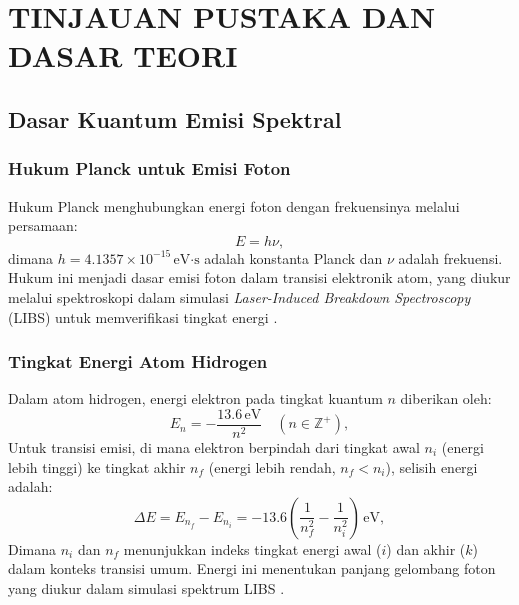 
\chapter{TINJAUAN PUSTAKA DAN DASAR TEORI}

\section{Dasar Kuantum Emisi Spektral}

\subsection{Hukum Planck untuk Emisi Foton}
Hukum Planck menghubungkan energi foton dengan frekuensinya melalui persamaan:
\begin{equation}
E = h\nu, \label{planck}
\end{equation}
dimana \( h = 4.1357 \times 10^{-15} \, \text{eV·s} \) adalah konstanta Planck dan \( \nu \) adalah frekuensi. Hukum ini menjadi dasar emisi foton dalam transisi elektronik atom, yang diukur melalui spektroskopi dalam simulasi \textit{Laser-Induced Breakdown Spectroscopy} (LIBS) untuk memverifikasi tingkat energi \citep{Beiser1992}.

\subsection{Tingkat Energi Atom Hidrogen}
Dalam atom hidrogen, energi elektron pada tingkat kuantum \( n \) diberikan oleh:
\begin{equation}
E_n = -\frac{13.6 \, \text{eV}}{n^2} \quad (n \in \mathbb{Z}^+), \label{energy_hydrogen}
\end{equation}
Untuk transisi emisi, di mana elektron berpindah dari tingkat awal \( n_i \) (energi lebih tinggi) ke tingkat akhir \( n_f \) (energi lebih rendah, \( n_f < n_i \)), selisih energi adalah:
\begin{equation}
\Delta E = E_{n_f} - E_{n_i} = -13.6 \left( \frac{1}{n_f^2} - \frac{1}{n_i^2} \right) \, \text{eV}, \label{deltaE}
\end{equation}
Dimana \( n_i \) dan \( n_f \) menunjukkan indeks tingkat energi awal (\( i \)) dan akhir (\( k \)) dalam konteks transisi umum. Energi ini menentukan panjang gelombang foton yang diukur dalam simulasi spektrum LIBS \citep{Griffiths2005}.

